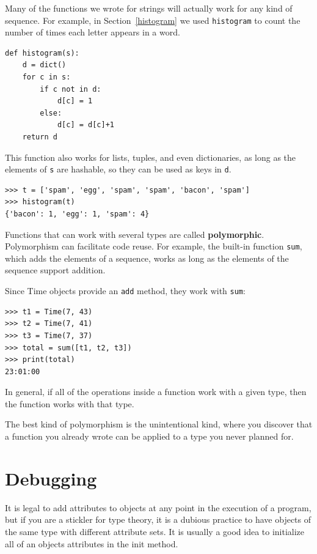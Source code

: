 \documentclass[10pt]{book}
\begin{document}

Many of the functions we wrote for strings will actually
work for any kind of sequence.
For example, in Section~\ref{histogram}
we used {\tt histogram} to count the number of times each letter
appears in a word.

\beforeverb
\begin{verbatim}
def histogram(s):
    d = dict()
    for c in s:
        if c not in d:
            d[c] = 1
        else:
            d[c] = d[c]+1
    return d
\end{verbatim}
\afterverb
%
This function also works for lists, tuples, and even dictionaries,
as long as the elements of {\tt s} are hashable, so they can be used
as keys in {\tt d}.

\beforeverb
\begin{verbatim}
>>> t = ['spam', 'egg', 'spam', 'spam', 'bacon', 'spam']
>>> histogram(t)
{'bacon': 1, 'egg': 1, 'spam': 4}
\end{verbatim}
\afterverb
%
Functions that can work with several types are called {\bf polymorphic}.
Polymorphism can facilitate code reuse.  For example, the built-in
function {\tt sum}, which adds the elements of a sequence, works
as long as the elements of the sequence support addition.


Since Time objects provide an {\tt add} method, they work
with {\tt sum}:

\beforeverb
\begin{verbatim}
>>> t1 = Time(7, 43)
>>> t2 = Time(7, 41)
>>> t3 = Time(7, 37)
>>> total = sum([t1, t2, t3])
>>> print(total)
23:01:00
\end{verbatim}
\afterverb
%
In general, if all of the operations inside a function 
work with a given type, then the function works with that type.

The best kind of polymorphism is the unintentional kind, where
you discover that a function you already wrote can be
applied to a type you never planned for.


\section{Debugging}

It is legal to add attributes to objects at any point in the execution
of a program, but if you are a stickler for type theory, it is a
dubious practice to have objects of the same type with different
attribute sets.  It is usually a good idea to
initialize all of an objects attributes in the init method.
\end{document}
